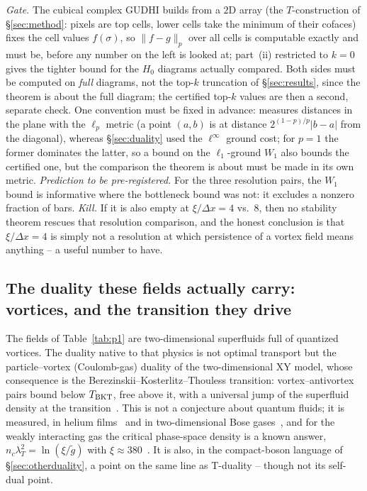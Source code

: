 \documentclass[11pt,a4paper]{article}
\begin{document}
\emph{Gate.} The cubical complex GUDHI builds from a $2$D array (the $T$-construction of
\S\ref{sec:method}: pixels are top cells, lower cells take the minimum of their cofaces) fixes the cell
values $f(\sigma)$, so $\|f-g\|_p$ over all cells is computable exactly and must be, before any number
on the left is looked at; part~(ii) restricted to $k=0$ gives the tighter bound for the $H_0$ diagrams
actually compared. Both sides must be computed on \emph{full} diagrams, not the top-$k$ truncation of
\S\ref{sec:results}, since the theorem is about the full diagram; the certified top-$k$ values are then
a second, separate check. One convention must be fixed in advance: \cite{SkrabaTurner2020} measures
distances in the plane with the $\ell_p$ metric (a point $(a,b)$ is at distance $2^{(1-p)/p}|b-a|$ from
the diagonal), whereas \S\ref{sec:duality} used the $\ell^\infty$ ground cost; for $p=1$ the former
dominates the latter, so a bound on the $\ell_1$-ground $W_1$ also bounds the certified one, but the
comparison the theorem is about must be made in its own metric. \emph{Prediction to be pre-registered.} For the three resolution pairs, the $W_1$ bound is
informative where the bottleneck bound was not: it excludes a nonzero fraction of bars. \emph{Kill.}
If it is also empty at $\xi/\Delta x=4$ vs.\ $8$, then no stability theorem rescues that resolution
comparison, and the honest conclusion is that $\xi/\Delta x=4$ is simply not a resolution at which
persistence of a vortex field means anything -- a useful number to have.

\subsection{The duality these fields actually carry: vortices, and the transition they drive}

The fields of Table~\ref{tab:p1} are two-dimensional superfluids full of quantized vortices. The duality
native to that physics is not optimal transport but the particle--vortex (Coulomb-gas) duality of the
two-dimensional XY model, whose consequence is the Berezinskii--Kosterlitz--Thouless transition:
vortex--antivortex pairs bound below $T_{\rm BKT}$, free above it, with a universal jump of the
superfluid density at the transition~\cite{NelsonKosterlitz1977}. This is not a conjecture about
quantum fluids; it is measured, in helium films~\cite{BishopReppy1978} and in two-dimensional Bose
gases~\cite{Hadzibabic2006}, and for the weakly interacting gas the critical phase-space density is a
known answer, $n_c\lambda_T^2=\ln(\xi/\tilde g)$ with $\xi\approx380$~\cite{Prokofev2001}. It is also,
in the compact-boson language of \S\ref{sec:otherduality}, a point on the same line as T-duality --
though not its self-dual point.
\end{document}
